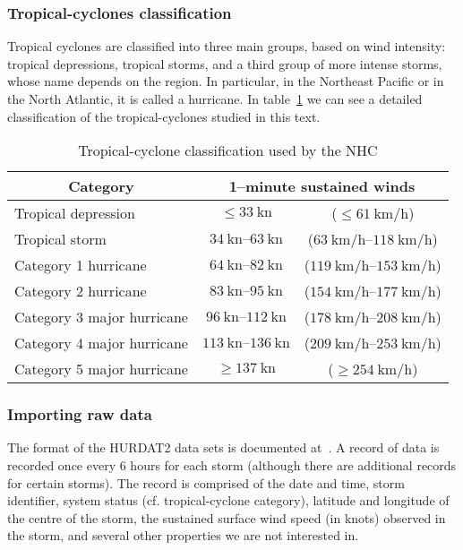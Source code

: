 \subsubsection{Tropical-cyclones classification}\label{ssec:hurr-class}
Tropical cyclones are classified into three main groups, based on wind intensity: tropical depressions, tropical storms, and a third group of more intense storms, whose name depends on the region. In particular, in the Northeast Pacific or in the North Atlantic, it is called a hurricane. In table~\ref{tab:hurr-class} we can see a detailed classification of the tropical-cyclones studied in this text.
\begin{table}[H]
	\centering
	\begin{tabular}{l c c}
		\toprule
		\toprule
		\multicolumn{1}{c}{Category} & \multicolumn{2}{c}{1--minute sustained winds} \\
		\midrule
		Tropical depression  & $\le \SI{33}{\knot}$      & ($\le \SI{61}{\km/\hour}$) \\
		Tropical storm       & $\SIrange{34}{63}{\knot}$ & ($\SIrange{63}{118}{\km/\hour}$) \\
		Category 1 hurricane & $\SIrange{64}{82}{\knot}$ & ($\SIrange{119}{153}{\km/\hour}$) \\
		Category 2 hurricane & $\SIrange{83}{95}{\knot}$ & ($\SIrange{154}{177}{\km/\hour}$) \\
		Category 3 major hurricane & $\SIrange{96}{112}{\knot}$  & ($\SIrange{178}{208}{\km/\hour}$) \\
		Category 4 major hurricane & $\SIrange{113}{136}{\knot}$ & ($\SIrange{209}{253}{\km/\hour}$) \\
		Category 5 major hurricane & $\ge \SI{137}{\knot}$       & ($\ge \SI{254}{\km/\hour}$) \\
		\bottomrule
	\end{tabular}
	\caption{Tropical-cyclone classification used by the NHC}
	\label{tab:hurr-class}
\end{table}

\subsubsection{Importing raw data}\label{ssec:hurdat-import}
The format of the HURDAT2 data sets is documented at~\cite{Landsea2014,Landsea2016}. A record of data is recorded once every 6 hours for each storm (although there are additional records for certain storms). The record is comprised of the date and time, storm identifier, system status (cf. tropical-cyclone category), latitude and longitude of the centre of the storm, the sustained surface wind speed (in knots) observed in the storm, and several other properties we are not interested in.

